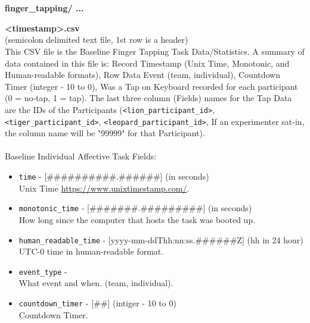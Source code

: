 \begin{description}
\begin{addmargin}[0em]{0em}
    \end{addmargin} %


    \textbf{\\\\}
    \begin{addmargin}[0em]{0em} %
        \textbf{finger\_tapping/ ...}

        \begin{addmargin}[1em]{0em} %
            \label{finger_tapping/<timestamp>.csv}
            \textbf{<timestamp>.csv}\\(semicolon delimited text file, 1st row is a header)\\
            This CSV file is the Baseline Finger Tapping Task Data/Statistics.
            A summary of data contained in this file is: Record Timestamp (Unix Time, Monotonic, and Human-readable formats),
            Row Data Event (team, individual), Countdown Timer (integer - 10 to 0), Was a Tap on Keyboard recorded for each participant (0 = no-tap, 1 = tap).
            The last three column (Fields) names for the Tap Data are the IDs of the Participants (\verb|<lion_participant_id>|, \verb|<tiger_participant_id>|,
            \verb|<leopard_participant_id>|, If an experimenter sat-in, the column name will be "99999" for that Participant).\\\\
            Baseline Individual Affective Task Fields:
            \begin{itemize}
                \item \verb|time| - [\#\#\#\#\#\#\#\#\#\#.\#\#\#\#\#\#] (in seconds)\\Unix Time \href{https://www.unixtimestamp.com/}{https://www.unixtimestamp.com/}.
                \item \verb|monotonic_time| - [\#\#\#\#\#\#\#.\#\#\#\#\#\#\#\#\#] (in seconds)\\How long since the computer that hosts the task was booted up.
                \item \verb|human_readable_time| - [yyyy-mm-ddThh:nn:ss.\#\#\#\#\#\#Z] (hh in 24 hour)\\ UTC-0 time in human-readable format.
                \item \verb|event_type| -\\What event and when. (team, individual).
                \item \verb|countdown_timer| - [\#\#] (intiger - 10 to 0)\\Countdown Timer.

\end{itemize}
\end{addmargin}
\end{addmargin}
\end{description}

